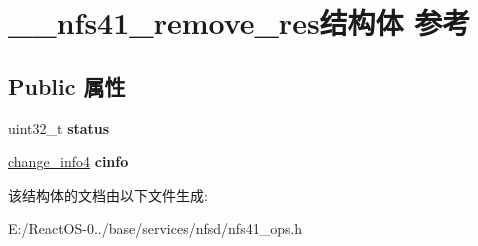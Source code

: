 \hypertarget{struct____nfs41__remove__res}{}\section{\+\_\+\+\_\+nfs41\+\_\+remove\+\_\+res结构体 参考}
\label{struct____nfs41__remove__res}
\subsection*{Public 属性}
\begin{DoxyCompactItemize}
\item 
\mbox{\label{struct____nfs41__remove__res_a5d807ddfa0ebbfafc23b7e476fe40d72}} 
uint32\+\_\+t {\bfseries status}
\item 
\mbox{\label{struct____nfs41__remove__res_ac524724d285e2bd25696306c9449e34c}} 
\hyperlink{struct____change__info4}{change\+\_\+info4} {\bfseries cinfo}
\end{DoxyCompactItemize}


该结构体的文档由以下文件生成\+:\begin{DoxyCompactItemize}
\item 
E\+:/\+React\+O\+S-\/0../base/services/nfsd/nfs41\+\_\+ops.\+h\end{DoxyCompactItemize}
